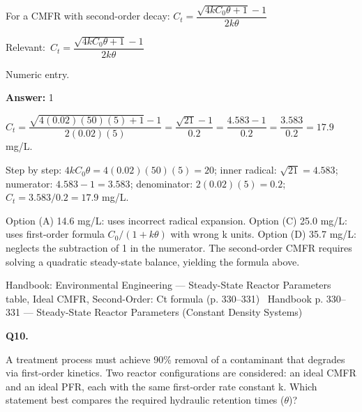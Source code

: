 \documentclass[11pt]{article}
\begin{document}
For a CMFR with second-order decay: $C_t = \dfrac{\sqrt{4k C_0 \theta + 1} - 1}{2k\theta}$\par\vspace{3pt}
{\small\color{soft}Relevant:}\ $C_t = \dfrac{\sqrt{4k C_0 \theta + 1} - 1}{2k\theta}$\par\vspace{3pt}
{\small\color{soft}Numeric entry.}\par\vspace{3pt}
\vspace{2pt}\par\noindent\colorbox{boxbg}{\parbox{\dimexpr\linewidth-2\fboxsep\relax}{%
\vspace{2pt}\textbf{Answer:} 1\par\vspace{2pt}
{\small $C_t = \dfrac{\sqrt{4(0.02)(50)(5)+1}-1}{2(0.02)(5)} = \dfrac{\sqrt{21}-1}{0.2} = \dfrac{4.583-1}{0.2} = \dfrac{3.583}{0.2} = 17.9$ mg/L.

Step by step: $4kC_0\theta = 4(0.02)(50)(5) = 20$; inner radical: $\sqrt{21} = 4.583$; numerator: $4.583-1=3.583$; denominator: $2(0.02)(5)=0.2$; $C_t = 3.583/0.2 = 17.9$ mg/L.

Option (A) 14.6 mg/L: uses incorrect radical expansion. Option (C) 25.0 mg/L: uses first-order formula $C_0/(1+k\theta)$ with wrong k units. Option (D) 35.7 mg/L: neglects the subtraction of 1 in the numerator. The second-order CMFR requires solving a quadratic steady-state balance, yielding the formula above.}\par\vspace{2pt}
{\footnotesize\color{soft}Handbook: Environmental Engineering --- Steady-State Reactor Parameters table, Ideal CMFR, Second-Order: Ct formula (p. 330--331) \textbullet\ Handbook p. 330--331 --- Steady-State Reactor Parameters (Constant Density Systems)}\vspace{2pt}
}}
\vspace{9pt}
\filbreak
\textbf{\color{accent}Q10.}\par\vspace{2pt}
A treatment process must achieve 90\% removal of a contaminant that degrades via first-order kinetics. Two reactor configurations are considered: an ideal CMFR and an ideal PFR, each with the same first-order rate constant k. Which statement best compares the required hydraulic retention times ($\theta$)?\par\vspace{3pt}
\end{document}
